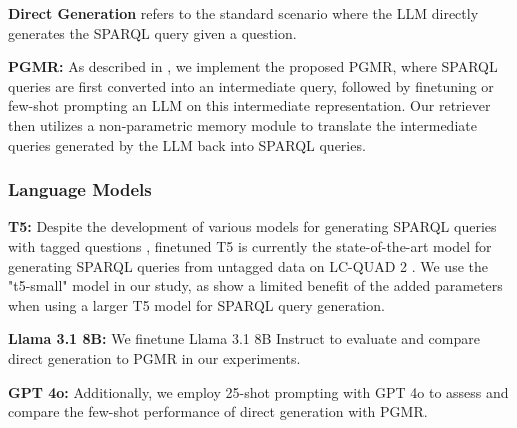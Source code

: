 \noindent \textbf{Direct Generation} refers to the standard scenario where the LLM directly generates the SPARQL query given a question.

\noindent \textbf{PGMR:} As described in , we implement the proposed PGMR, where SPARQL queries are first converted into an intermediate query, followed by finetuning or few-shot prompting an LLM on this intermediate representation. Our retriever then utilizes a non-parametric memory module to translate the intermediate queries generated by the LLM back into SPARQL queries.

\subsubsection{Language Models}
\label{sec:llms_used}

\noindent \textbf{T5:} Despite the development of various models for generating SPARQL queries with tagged questions \citep{banerjee,karou2023,qi2024enhancing}, finetuned T5 \citep{t5} is currently the state-of-the-art model for generating SPARQL queries from untagged data on LC-QUAD 2 \citep{karou2023}. 
We use the "t5-small" model in our study, as \citet{banerjee} show a limited benefit of the added parameters when using a larger T5 model for SPARQL query generation.

\noindent \textbf{Llama 3.1 8B:} We finetune Llama 3.1 8B Instruct \citep{llama3} to evaluate and compare direct generation to PGMR in our experiments.

\noindent \textbf{GPT 4o:} Additionally, we employ 25-shot prompting with GPT 4o \citep{gpt4} to assess and compare the few-shot performance of direct generation with PGMR.







